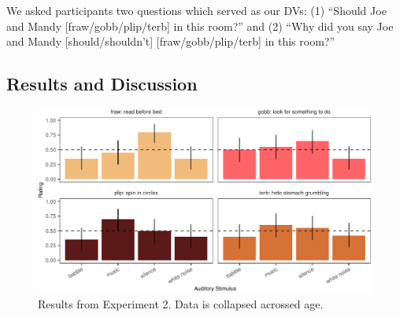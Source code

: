 \documentclass[10pt, letterpaper]{article}
\newenvironment{CodeChunk}{}{}
\begin{document}
We asked participants two questions which served as our DVs: (1)
``Should Joe and Mandy {[}fraw/gobb/plip/terb{]} in this room?'' and (2)
``Why did you say Joe and Mandy {[}should/shouldn't{]}
{[}fraw/gobb/plip/terb{]} in this room?''

\hypertarget{results-and-discussion-1}{%
\subsection{Results and Discussion}\label{results-and-discussion-1}}

\begin{CodeChunk}
\begin{figure}[t]

{\centering \includegraphics{figs/e4b-bar-1} 

}

\caption[Results from Experiment 2]{Results from Experiment 2. Data is collapsed acrossed age.}\label{fig:e4b-bar}
\end{figure}
\end{CodeChunk}
\end{document}
